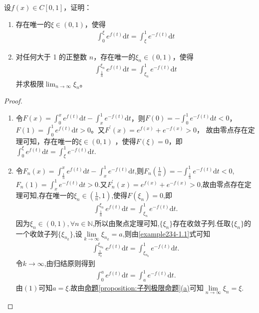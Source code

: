 \documentclass[../../main.tex]{subfiles}%
\begin{document}
\begin{example}
设$f(x)\in C[0,1]$，证明：
\begin{enumerate}[(1)]
\item 存在唯一的$\xi\in(0,1)$，使得
\begin{align*}
\int_{0}^{\xi}e^{f(t)}\mathrm{d}t=\int_{\xi}^{1}e^{-f(t)}\mathrm{d}t
\end{align*}

\item 对任何大于 1 的正整数 $n$，存在唯一的$\xi_n\in(0,1)$，使得
\begin{align*}
\int_{\frac{1}{n}}^{\xi_n}e^{f(t)}\mathrm{d}t=\int_{\xi_n}^{1}e^{-f(t)}\mathrm{d}t
\end{align*}
并求极限$\lim_{n \to \infty}\xi_n$。
\end{enumerate}
\end{example}
\begin{proof}
\begin{enumerate}[(1)]
\item 令$F(x) = \int_0^x e^{f(t)} \mathrm{d}t - \int_x^1 e^{-f(t)} \mathrm{d}t$，则$F(0) = -\int_0^1 e^{-f(t)} \mathrm{d}t < 0$，$F(1) = \int_0^1 e^{f(t)} \mathrm{d}t > 0$。又$F^\prime(x) = e^{f(x)} + e^{-f(x)} > 0$，
故由零点存在定理可知，存在唯一的$\xi \in (0,1)$ ，使得$F(\xi) = 0$，即$\int_0^{\xi} e^{f(t)} \mathrm{d}t = \int_{\xi}^1 e^{-f(t)} \mathrm{d}t$.

\item 令$F_n(x)=\int_{\frac{1}{n}}^x{e^{f(t)}\mathrm{d}t}-\int_x^1{e^{-f(t)}\mathrm{d}t}$,则$F_n\left(\frac{1}{n}\right)=-\int_{\frac{1}{n}}^1{e^{-f(t)}\mathrm{d}t}<0$,$F_n(1)=\int_x^1{e^{-f(t)}\mathrm{d}t}>0$.又$F_{n}^{\prime}(x)=e^{f(x)}+e^{-f(x)}>0$,故由零点存在定理可知,存在唯一的$\xi_n\in\left(\frac{1}{n},1\right)$,使得$F(\xi_n)=0$,即
\begin{align}
\int_{\frac{1}{n}}^{\xi_n}{e^{f(t)}\mathrm{d}t}=\int_{\xi_n}^1{e^{-f(t)}\mathrm{d}t}.\label{example234-1.1}
\end{align}
因为$\xi_n\in(0,1),\forall n\in\mathbb{N}$,所以由聚点定理可知,$\{\xi_n\}$存在收敛子列.任取$\{\xi_n\}$的一个收敛子列$\{\xi_{n_k}\}$,设$\underset{k\rightarrow\infty}{\lim}\xi_{n_k}=a$,则由\eqref{example234-1.1}式可知
\begin{align*}
\int_{\frac{1}{n_k}}^{\xi_{n_k}}{e^{f(t)}\mathrm{d}t}=\int_{\xi_{n_k}}^1{e^{-f(t)}\mathrm{d}t}.
\end{align*}
令$k\rightarrow\infty$,由归结原则得到
\begin{align*}
\int_0^a{e^{f(t)}\mathrm{d}t}=\int_a^1{e^{-f(t)}\mathrm{d}t}.
\end{align*}
由$(1)$可知$a=\xi$.故由\hyperref[proposition:子列极限命题]{命题\ref{proposition:子列极限命题}(a)}可知$\underset{n\rightarrow\infty}{\lim}\xi_n=\xi$.
\end{enumerate}

\end{proof}
\end{document}
